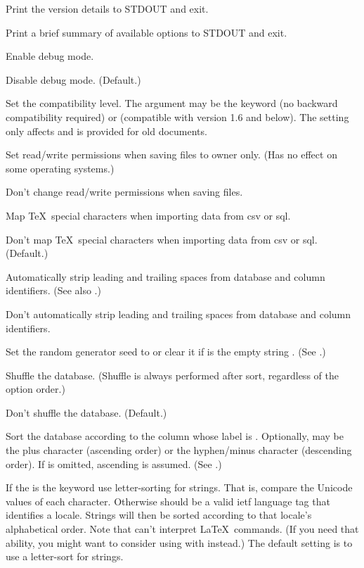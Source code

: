 Print the version details to STDOUT and exit.

Print a brief summary of available options to STDOUT and exit.

Enable debug mode.

Disable debug mode. (Default.)

 
Set the compatibility level. The argument may be the keyword
 (no backward compatibility required) or 
(compatible with version 1.6 and below).  The  setting only affects  and is provided for old
documents.

Set read/write permissions when saving  files to owner only.
(Has no effect on some operating systems.)

Don't change read/write permissions when saving  files.

Map \TeX\ special characters when importing data from 
\gls{csv} or \gls{sql}.

Don't map \TeX\ special characters when importing data from
\gls{csv} or \gls{sql}. (Default.)

Automatically strip leading and trailing spaces from database 
and column identifiers. (See also .)

Don't automatically strip leading and trailing spaces from database 
and column identifiers.

Set the random generator seed to  or clear it
if  is the empty string . (See .)

Shuffle the database. (Shuffle is always performed after sort,
regardless of the option order.)

Don't shuffle the database. (Default.)

Sort the database according to the column whose label is
. Optionally,  may be the plus character
\qtt{+} (ascending order) or the hyphen\slash minus character
\qtt{-} (descending order).  If  is omitted, ascending
is assumed.  (See .)

If the  is the keyword  use letter-sorting
for strings. That is, compare the Unicode values of each character.
Otherwise  should be a valid \gls{ietf} 
language tag that identifies a locale. Strings will then be sorted 
according to that locale's alphabetical order. Note that  can't 
interpret \LaTeX\ commands. (If you need that ability, you might want 
to consider using  with  
instead.) The default setting is to use a letter-sort for strings.

